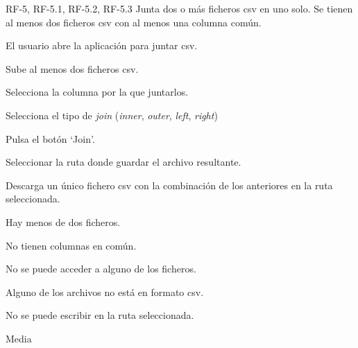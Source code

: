 
{RF-5, RF-5.1, RF-5.2, RF-5.3}
{Junta dos o más ficheros csv en uno solo.}
{Se tienen al menos dos ficheros csv con al menos una columna común.}
{
	\item El usuario abre la aplicación para juntar csv.
	\item Sube al menos dos ficheros csv.
	\item Selecciona la columna por la que juntarlos.
	\item Selecciona el tipo de \textit{join} (\textit{inner}, \textit{outer}, \textit{left}, \textit{right})
	\item Pulsa el botón `Join'.
	\item Seleccionar la ruta donde guardar el archivo resultante.
}
{Descarga un único fichero csv con la combinación de los anteriores en la ruta seleccionada.}
{
	\item Hay menos de dos ficheros.
	\item No tienen columnas en común.
	\item No se puede acceder a alguno de los ficheros.
	\item Alguno de los archivos no está en formato csv.
	\item No se puede escribir en la ruta seleccionada.
}
{Media}

